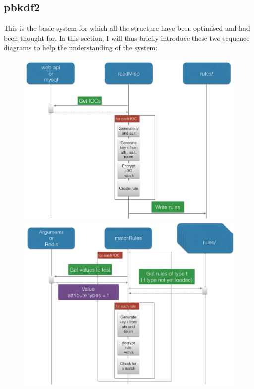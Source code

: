\documentclass{eplmastersthesis}
\begin{document}
\subsection{\gls{pbkdf2}}
This is the basic system for which all the structure have been optimised and had been thought for. In this section, I will thus briefly introduce these two sequence diagrams to help the understanding of the system:
\begin{figure}[h!]
\begin{center}
   \begin{minipage}[c]{.46\linewidth}
      \includegraphics[scale=0.25]{res/seqDiagramRead}
   \end{minipage} \hfill
   \begin{minipage}[c]{.46\linewidth}
      \includegraphics[scale=0.25]{res/seqDiagramMatch}
   \end{minipage}
\end{center}
\end{figure}
\end{document}
